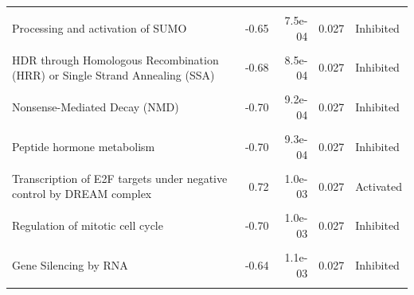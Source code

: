 \documentclass[9pt,a4paper,]{extarticle}
\begin{document}
\begin{table}
{\begin{tabular}[t]{lrrrl}
\cellcolor{gray!6}{rRNA processing in the nucleus and cytosol} & \cellcolor{gray!6}{-0.71} & \cellcolor{gray!6}{6.5e-04} & \cellcolor{gray!6}{0.024} & \cellcolor{gray!6}{Inhibited}\\
Processing and activation of SUMO & -0.65 & 7.5e-04 & 0.027 & Inhibited\\
\addlinespace
\cellcolor{gray!6}{Phosphorylation of the APC/C} & \cellcolor{gray!6}{-0.70} & \cellcolor{gray!6}{7.9e-04} & \cellcolor{gray!6}{0.027} & \cellcolor{gray!6}{Inhibited}\\
HDR through Homologous Recombination (HRR) or Single Strand Annealing (SSA) & -0.68 & 8.5e-04 & 0.027 & Inhibited\\
\cellcolor{gray!6}{SUMOylation of RNA binding proteins} & \cellcolor{gray!6}{-0.68} & \cellcolor{gray!6}{8.7e-04} & \cellcolor{gray!6}{0.027} & \cellcolor{gray!6}{Inhibited}\\
Nonsense-Mediated Decay (NMD) & -0.70 & 9.2e-04 & 0.027 & Inhibited\\
\cellcolor{gray!6}{Nonsense Mediated Decay (NMD) enhanced by the Exon Junction Complex (EJC)} & \cellcolor{gray!6}{-0.70} & \cellcolor{gray!6}{9.2e-04} & \cellcolor{gray!6}{0.027} & \cellcolor{gray!6}{Inhibited}\\
\addlinespace
Peptide hormone metabolism & -0.70 & 9.3e-04 & 0.027 & Inhibited\\
\cellcolor{gray!6}{Terminal pathway of complement} & \cellcolor{gray!6}{-0.67} & \cellcolor{gray!6}{9.6e-04} & \cellcolor{gray!6}{0.027} & \cellcolor{gray!6}{Inhibited}\\
Transcription of E2F targets under negative control by DREAM complex & 0.72 & 1.0e-03 & 0.027 & Activated\\
\cellcolor{gray!6}{APC/C-mediated degradation of cell cycle proteins} & \cellcolor{gray!6}{-0.70} & \cellcolor{gray!6}{1.0e-03} & \cellcolor{gray!6}{0.027} & \cellcolor{gray!6}{Inhibited}\\
Regulation of mitotic cell cycle & -0.70 & 1.0e-03 & 0.027 & Inhibited\\
\addlinespace
\cellcolor{gray!6}{SRP-dependent cotranslational protein targeting to membrane} & \cellcolor{gray!6}{-0.72} & \cellcolor{gray!6}{1.0e-03} & \cellcolor{gray!6}{0.027} & \cellcolor{gray!6}{Inhibited}\\
Gene Silencing by RNA & -0.64 & 1.1e-03 & 0.027 & Inhibited\\
\cellcolor{gray!6}{BMAL1:CLOCK,NPAS2 activates circadian gene expression} & \cellcolor{gray!6}{0.61} & \cellcolor{gray!6}{1.1e-03} & \cellcolor{gray!6}{0.027} & \cellcolor{gray!6}{Activated}\\

\end{tabular}}
\end{table}
\end{document}
